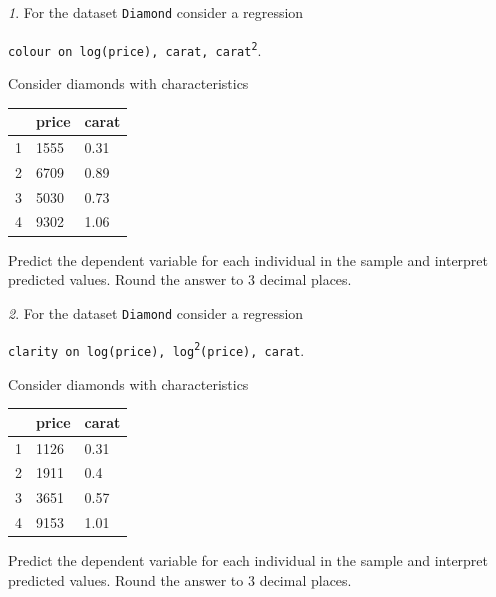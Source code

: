 \documentclass[12pt]{article}
\theoremstyle{remark}
\newtheorem{problem}{}[section]
\begin{document}
\begin{problem}
For the dataset \texttt{Diamond} consider a regression
\begin{center}
	\texttt{colour on log(price), carat, carat\textsuperscript{2}}.
\end{center}
Consider diamonds with characteristics
\begin{center}
	\begin{tabular}{c|l|l}
		& price & carat \\ \hline
	1 & 1555 & 0.31 \\
	2 & 6709 & 0.89 \\
	3 & 5030 & 0.73 \\
	4 & 9302 & 1.06 \\ \hline
	\end{tabular}
\end{center}
Predict the dependent variable for each individual in the sample and interpret predicted values. 
Round the answer to 3 decimal places.
\end{problem}

\begin{problem}
For the dataset \texttt{Diamond} consider a regression
\begin{center}
	\texttt{clarity on log(price), log\textsuperscript{2}(price), carat}.
\end{center}
Consider diamonds with characteristics
\begin{center}
	\begin{tabular}{c|l|l}
		& price & carat \\ \hline
	1 & 1126 & 0.31 \\
	2 & 1911 & 0.4 \\
	3 & 3651 & 0.57 \\
	4 & 9153 & 1.01 \\ \hline
	\end{tabular}
\end{center}
Predict the dependent variable for each individual in the sample and interpret predicted values. 
Round the answer to 3 decimal places.
\end{problem}
\end{document}
